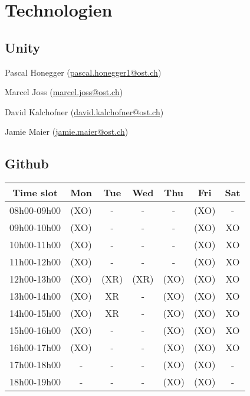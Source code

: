 \chapter{Technologien}

\section{Unity}

\begin{compactenum}
    \item Pascal Honegger (\href{mailto:pascal.honegger1@ost.ch}{pascal.honegger1@ost.ch})
    \item Marcel Joss (\href{mailto:marcel.joss@ost.ch}{marcel.joss@ost.ch})
    \item David Kalchofner (\href{mailto:david.kalchofner@ost.ch}{david.kalchofner@ost.ch})
    \item Jamie Maier (\href{mailto:jamie.maier@ost.ch}{jamie.maier@ost.ch})
\end{compactenum}

\section{Github}


\begin{flushleft}
    \begin{tabular}{|c|c|c|c|c|c|c|}
        \hline
        Time slot   & Mon  & Tue  & Wed  & Thu & Fri   & Sat \\ \hline
        08h00-09h00 & (XO) &  -   &  -   &  -  & (XO)  &  -  \\ \hline
        09h00-10h00 & (XO) &  -   &  -   &  -  & (XO)  & XO  \\ \hline
        10h00-11h00 & (XO) &  -   &  -   &  -  & (XO)  & XO  \\ \hline
        11h00-12h00 & (XO) &  -   &  -   &  -  & (XO)  & XO  \\ \hline
        \rowcolor[HTML]{EFEFEF}
        12h00-13h00 & (XO) & (XR) & (XR) & (XO) & (XO) & XO  \\ \hline
        13h00-14h00 & (XO) & XR   &  -   & (XO) & (XO) & XO  \\ \hline
        14h00-15h00 & (XO) & XR   &  -   & (XO) & (XO) & XO  \\ \hline
        15h00-16h00 & (XO) &  -   &  -   & (XO) & (XO) & XO  \\ \hline
        16h00-17h00 & (XO) &  -   &  -   & (XO) & (XO) & XO  \\ \hline
        \rowcolor[HTML]{EFEFEF}
        17h00-18h00 &  -   &  -   &  -   & (XO)  & (XO) &  -  \\ \hline
        \rowcolor[HTML]{EFEFEF}
        18h00-19h00 &  -   &  -   &  -   & (XO) & (XO) &  -  \\ \hline
    \end{tabular}

\end{flushleft}

